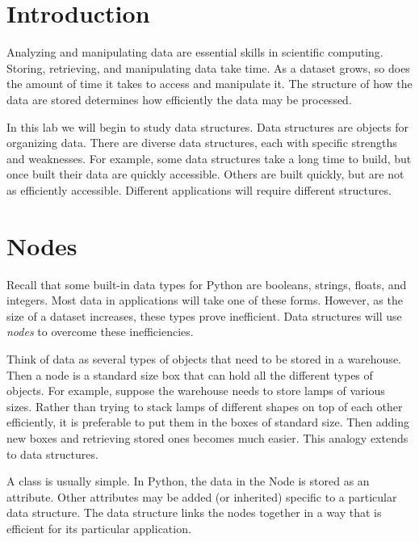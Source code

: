 \label{lab:Python_DataStructures}


\section*{Introduction}

Analyzing and manipulating data are essential skills in scientific computing.
Storing, retrieving, and manipulating data take time.
As a dataset grows, so does the amount of time it takes to access and manipulate it.
The structure of how the data are stored determines how efficiently the data may be processed.

In this lab we will begin to study data structures.
Data structures are objects for organizing data.
There are diverse data structures, each with specific strengths and weaknesses.
For example, some data structures take a long time to build, but once built their data are quickly accessible.
Others are built quickly, but are not as efficiently accessible.
Different applications will require different structures.

\section*{Nodes}

Recall that some built-in data types for Python are booleans, strings, floats, and integers.
Most data in applications will take one of these forms.
However, as the size of a dataset increases, these types prove inefficient.
Data structures will use \emph{nodes} to overcome these inefficiencies.

Think of data as several types of objects that need to be stored in a warehouse.
Then a node is a standard size box that can hold all the different types of objects.
For example, suppose the warehouse needs to store lamps of various sizes.
Rather than trying to stack lamps of different shapes on top of each other efficiently, it is preferable to put them in the boxes of standard size.
Then adding new boxes and retrieving stored ones becomes much easier.
This analogy extends to data structures.

A  class is usually simple.
In Python, the data in the Node is stored as an attribute.
Other attributes may be added (or inherited) specific to a particular data structure.
The data structure links the nodes together in a way that is efficient for its particular application.

